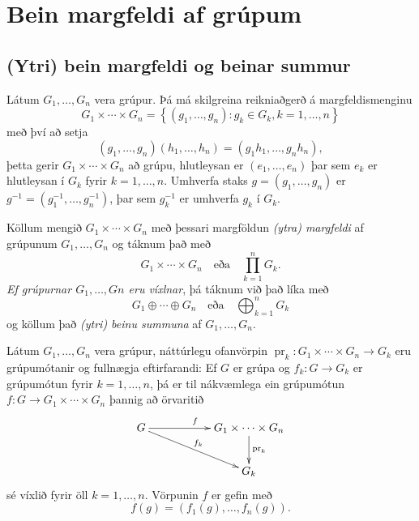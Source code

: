 \documentclass[a4paper,icelandic,11pt]{book}
\theoremstyle{plain}
\DeclareMathOperator{\pr}{pr} %
\begin{document}
\chapter{Bein margfeldi af grúpum}

\section{(Ytri) bein margfeldi og beinar summur}
Látum $G_1,\dots,G_n$ vera grúpur. Þá má skilgreina reikniaðgerð á
margfeldismenginu 
\[
G_1\times\cdots \times G_n 
= \left\{ (g_1,\dots,g_n):g_k\in G_k, k=1,\dots,n \right\}
\]
með því að setja
\[
(g_1,\dots,g_n)(h_1,\dots,h_n)
= (g_1 h_1,\dots,g_n h_n),
\]
þetta gerir $G_1\times \cdots \times G_n$ að grúpu, hlutleysan er
$(e_1,\dots,e_n)$ þar sem $e_k$ er hlutleysan í $G_k$ fyrir $k=1,\dots,n$.
Umhverfa staks $g = (g_1,\dots,g_n)$ er $g^{-1} = (g_1^{-1},\dots,g_n^{-1})$,
þar sem $g_k^{-1}$ er umhverfa $g_k$ í $G_k$.
\begin{skilgr}
  Köllum mengið $G_1\times \cdots \times G_n$ með þessari margföldun
  \emph{(ytra) margfeldi}
  af grúpunum $G_1,\dots,G_n$ og táknum það með
  \begin{equation*}
    G_1\times\cdots\times G_n
    \quad\text{eða}\quad
    \prod_{k=1}^n G_k.
  \end{equation*}
  \emph{Ef grúpurnar $G_1,\dots,Gn$ eru víxlnar}, þá táknum við það líka með
  \[
  G_1 \oplus\cdots\oplus G_n
  \quad\text{eða}\quad
  \bigoplus_{k=1}^n G_k
  \]
  og köllum það \emph{(ytri) beinu summuna}
  af $G_1,\dots,G_n$.
\end{skilgr}
\begin{setn}
  Látum $G_1,\dots,G_n$ vera grúpur, náttúrlegu ofanvörpin
  $\pr_k:G_1\times\cdots\times G_n\to G_k$ eru grúpumótanir og fullnægja
  eftirfarandi: Ef $G$ er grúpa og $f_k:G\to G_k$ er grúpumótun fyrir
  $k=1,\dots,n$, þá er til nákvæmlega ein grúpumótun $f:G\to
  G_1\times\cdots\times G_n$ þannig að örvaritið
  \begin{equation*}
    \xymatrix{
    G\ar[rr]^f \ar[drr]^{f_k} && G_1\times\cdots\times G_n\ar[d]^{\pr_k} \\
    && G_k
    }
  \end{equation*}
  sé víxlið fyrir öll $k=1,\dots,n$. Vörpunin $f$ er gefin með 
  \begin{equation*}
    f(g) = \left( f_1(g),\dots,f_n(g) \right).
  \end{equation*}
\end{setn}
\end{document}
